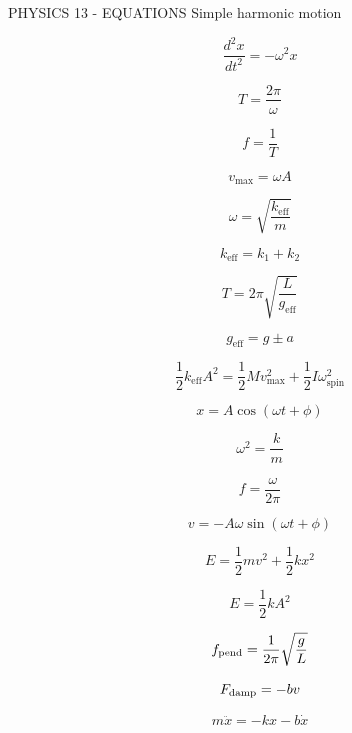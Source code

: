 PHYSICS 13 - EQUATIONS
Simple harmonic motion

$$\frac{d^2x}{dt^2} = -\omega^2 x$$

$$T = \frac{2\pi}{\omega}$$

$$f = \frac1T$$

$$v_{\max} = \omega A$$

$$\omega = \sqrt{\frac{k_{\text{eff}}}{m}}$$

$$k_{\text{eff}} = k_1 + k_2$$

$$T = 2\pi\sqrt{\frac{L}{g_{\text{eff}}}}$$

$$g_{\text{eff}} = g \pm a$$

$$\frac12 k_{\text{eff}}A^2 = \frac12 Mv_{\max}^2 + \frac12 I\omega_{\text{spin}}^2$$


$$x=A\cos(\omega t+\phi)$$

$$\omega^2=\frac{k}{m}$$

$$f=\frac{\omega}{2\pi}$$

$$v=-A\omega\sin(\omega t+\phi)$$

$$E=\frac12mv^2+\frac12kx^2$$

$$E=\frac12kA^2$$

$$f_{\rm pend}=\frac1{2\pi}\sqrt{\frac gL}$$

$$F_{\rm damp}=-bv$$

$$m\ddot x=-kx-b\dot x$$

